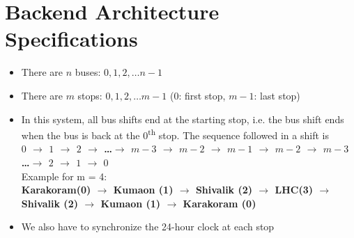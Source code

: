 \section{Backend Architecture Specifications}

\begin{itemize}
    \item There are $n$ buses: $0, 1, 2, \ldots n-1$
    \item There are $m$ stops: $0, 1, 2, \ldots m-1$  ($0$: first stop, $m-1$: last stop)
    \item In this system, all bus shifts end at the starting stop, i.e. the bus shift ends when the bus is back at the $0$\textsuperscript{th} stop. The sequence followed in a shift is \\
          {\bfseries $0$ $\to$ $1$ $\to$ $2$ $\to$ \ldots $\to$ $m-3$ $\to$ $m-2$ $\to$ $m-1$ $\to$ $m-2$ $\to$ $m-3$ \ldots$\to$ $2$ $\to$ $1$ $\to$ $0$}\\
          Example for m = 4: \\
          {\bfseries Karakoram(0) $\to$ Kumaon (1) $\to$ Shivalik (2) $\to$ \ac{LHC}(3) $\to$ Shivalik (2) $\to$ Kumaon (1) $\to$ Karakoram (0)}
    \item We also have to synchronize the \gls{24-hour clock} at each stop
\end{itemize}



